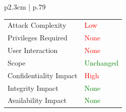 \begin{longtable}[l]{ p{2.3cm} | p{.79\linewidth} }
\begin{tabular}[t]{@{}l | l}
            Attack Complexity       & \textcolor{red}{Low} \\
            Privileges Required     & \textcolor{red}{None} \\
            User Interaction        & \textcolor{red}{None} \\
            Scope                   & \textcolor{Green}{Unchanged} \\
            Confidentiality Impact  & \textcolor{red}{High} \\
            Integrity Impact        & \textcolor{Green}{None} \\
            Availability Impact     & \textcolor{Green}{None}
        \end{tabular}
    \\ \hline
\end{longtable}

